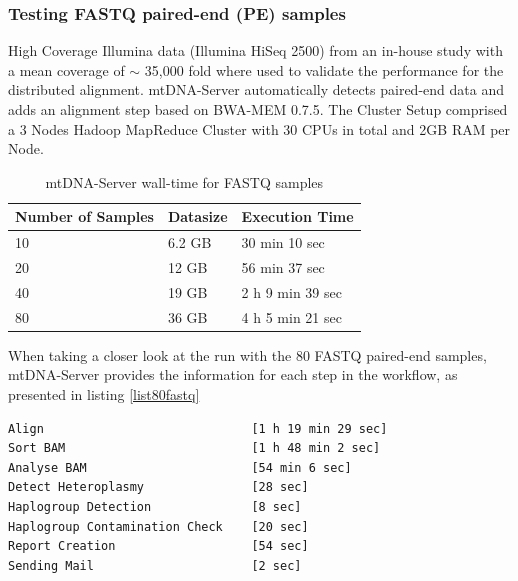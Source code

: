 \subsubsection{Testing FASTQ paired-end (PE) samples}
High Coverage Illumina data (Illumina HiSeq 2500) from an in-house study \cite{Kloss-Brandstatter2015} with a mean coverage of $\sim$ 35,000 fold where used to validate the performance for the distributed alignment.
mtDNA-Server automatically detects paired-end data and adds an alignment step based on BWA-MEM 0.7.5. The Cluster Setup comprised a 3 Nodes Hadoop MapReduce Cluster with 30 CPUs in total and 2GB RAM per Node.
\begin{table}[h]
\centering
\caption{mtDNA-Server wall-time for FASTQ samples}
\label{table:fastq}
\begin{tabular}{lll}
Number of Samples  &  Datasize & Execution Time \\
\hline
10 &   6.2 GB &  30 min 10 sec \\
20 &  12 GB &  56 min 37 sec   \\
40 &  19 GB &  2 h 9 min 39 sec  \\
80 & 36 GB &  4 h 5 min 21 sec   
\end{tabular}
\end{table}

When taking a closer look at the run with the 80 FASTQ paired-end samples, mtDNA-Server provides the information for each step in the workflow, as presented in listing \ref{list80fastq}  

\begin{lstlisting}[caption=Execution times of workflow-steps in analysis of 80 FASTQ samples with mtDNA-Server, label=list80fastq]
Align                             [1 h 19 min 29 sec]
Sort BAM                          [1 h 48 min 2 sec]
Analyse BAM                       [54 min 6 sec]
Detect Heteroplasmy               [28 sec]
Haplogroup Detection              [8 sec]
Haplogroup Contamination Check    [20 sec]
Report Creation                   [54 sec]
Sending Mail                      [2 sec]
\end{lstlisting}

